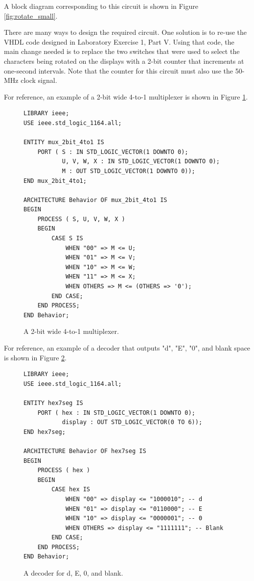 \documentclass{article}
\begin{document}
A block diagram corresponding to this circuit is shown in Figure \ref{fig:rotate_small}.

There are many ways to design the required circuit. One solution is to re-use the VHDL code designed in Laboratory Exercise 1, Part V. Using that code, the main change needed is to replace the two switches that were used to select the characters being rotated on the displays with a 2-bit counter that increments at one-second intervals. Note that the counter for this circuit must also use the 50-MHz clock signal.

For reference, an example of a 2-bit wide 4-to-1 multiplexer is shown in Figure \ref{fig:mux_4to1}.

\begin{figure}[H]
    \centering
    \begin{verbatim}
LIBRARY ieee;
USE ieee.std_logic_1164.all;

ENTITY mux_2bit_4to1 IS
    PORT ( S : IN STD_LOGIC_VECTOR(1 DOWNTO 0);
           U, V, W, X : IN STD_LOGIC_VECTOR(1 DOWNTO 0);
           M : OUT STD_LOGIC_VECTOR(1 DOWNTO 0));
END mux_2bit_4to1;

ARCHITECTURE Behavior OF mux_2bit_4to1 IS
BEGIN
    PROCESS ( S, U, V, W, X )
    BEGIN
        CASE S IS
            WHEN "00" => M <= U;
            WHEN "01" => M <= V;
            WHEN "10" => M <= W;
            WHEN "11" => M <= X;
            WHEN OTHERS => M <= (OTHERS => '0');
        END CASE;
    END PROCESS;
END Behavior;
    \end{verbatim}
    \caption{A 2-bit wide 4-to-1 multiplexer.}
    \label{fig:mux_4to1}
\end{figure}

For reference, an example of a decoder that outputs "d", "E", "0", and blank space is shown in Figure \ref{fig:decoder_de0}.

\begin{figure}[H]
    \centering
    \begin{verbatim}
LIBRARY ieee;
USE ieee.std_logic_1164.all;

ENTITY hex7seg IS
    PORT ( hex : IN STD_LOGIC_VECTOR(1 DOWNTO 0);
           display : OUT STD_LOGIC_VECTOR(0 TO 6));
END hex7seg;

ARCHITECTURE Behavior OF hex7seg IS
BEGIN
    PROCESS ( hex )
    BEGIN
        CASE hex IS
            WHEN "00" => display <= "1000010"; -- d
            WHEN "01" => display <= "0110000"; -- E
            WHEN "10" => display <= "0000001"; -- 0
            WHEN OTHERS => display <= "1111111"; -- Blank
        END CASE;
    END PROCESS;
END Behavior;
    \end{verbatim}
    \caption{A decoder for d, E, 0, and blank.}
    \label{fig:decoder_de0}
\end{figure}
\end{document}
